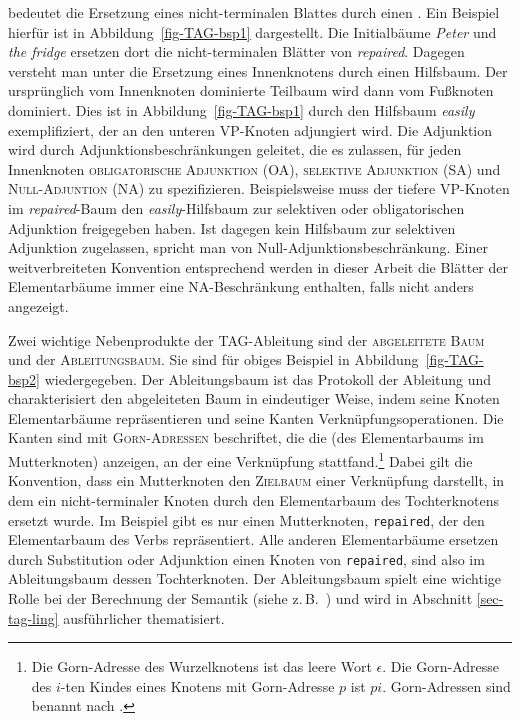  bedeutet die Ersetzung eines nicht-terminalen Blattes durch einen . Ein Beispiel hierfür ist in Abbildung~\ref{fig-TAG-bsp1} dargestellt. Die Initialbäume {\it Peter} und {\it the fridge} ersetzen dort die nicht-terminalen Blätter von {\it repaired}. Dagegen versteht man unter  die Ersetzung eines Innenknotens durch einen Hilfsbaum. Der ursprünglich vom Innenknoten dominierte Teilbaum wird dann vom Fu\ss knoten dominiert. Dies ist in Abbildung~\ref{fig-TAG-bsp1} durch den Hilfsbaum {\it easily} exemplifiziert, der an den unteren VP-Knoten adjungiert wird. Die Adjunktion wird durch Adjunktionsbeschränkungen geleitet, die es zulassen, für jeden Innenknoten \textsc{obligatorische Adjunktion (OA)}, \textsc{selektive Adjunktion (SA)} und \textsc{Null-Adjuntion (NA)} zu spezifizieren. Beispielsweise muss der tiefere VP-Knoten im {\it repaired}-Baum den {\it easily}-Hilfsbaum zur selektiven oder obligatorischen Adjunktion freigegeben haben. Ist dagegen kein Hilfsbaum zur selektiven Adjunktion zugelassen, spricht man von Null-Adjunktionsbeschrän\-kung. Einer weitverbreiteten Konvention entsprechend werden in dieser Arbeit die Blätter der Elementarbäume immer eine NA-Beschränkung enthalten, falls nicht anders angezeigt.

Zwei wichtige Nebenprodukte der TAG-Ableitung sind der \textsc{abgeleitete Baum} und der \textsc{Ableitungsbaum}. Sie sind für obiges Beispiel in Abbildung~\ref{fig-TAG-bsp2} wiedergegeben. Der Ableitungsbaum ist das Protokoll der Ableitung und charakterisiert den abgeleiteten Baum in eindeutiger Weise, indem seine Knoten Elementarbäume repräsentieren und seine Kanten Verknüpfungsoperationen. Die Kanten sind mit \textsc{Gorn-Adressen} beschriftet, die die  (des Elementarbaums im Mutterknoten) anzeigen, an der eine Verknüpfung stattfand.\footnote{Die Gorn-Adresse des Wurzelknotens ist das leere Wort $\epsilon$. Die Gorn-Adresse des $i$-ten Kindes eines Knotens mit Gorn-Adresse $p$ ist $pi$. Gorn-Adressen sind benannt nach \cite{Gorn:67}.} Dabei gilt die Konvention, dass ein Mutterknoten den \textsc{Zielbaum} einer Verknüpfung darstellt, in dem ein nicht-terminaler Knoten durch den Elementarbaum des Tochterknotens ersetzt wurde. Im Beispiel gibt es nur einen Mutterknoten, {\tt repaired}, der den Elementarbaum des Verbs repräsentiert. Alle anderen Elementarbäume ersetzen durch Substitution oder Adjunktion einen Knoten von {\tt repaired}, sind also im Ableitungsbaum dessen Tochterknoten. Der Ableitungsbaum spielt eine wichtige Rolle bei der Berechnung der Semantik (siehe z.\,B.\ \citealt{Kallmeyer:Joshi:03,Kallmeyer:Romero:08}) und wird in Abschnitt \ref{sec-tag-ling} ausführlicher thematisiert.

